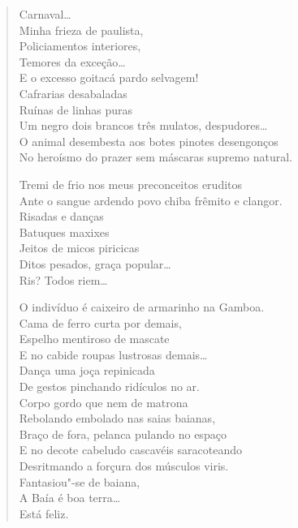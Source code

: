 {\begin{verse}
Carnaval\ldots{}\\
Minha frieza de paulista,\\
Policiamentos interiores,\\
Temores da exceção\ldots{}\\
E o excesso goitacá pardo selvagem!\\
Cafrarias desabaladas\\
Ruínas de linhas puras\\
Um negro dois brancos três mulatos, despudores\ldots{}\\
O animal desembesta aos botes pinotes desengonços\\
No heroísmo do prazer sem máscaras supremo natural.

Tremi de frio nos meus preconceitos eruditos\\
Ante o sangue ardendo povo chiba frêmito e clangor.\\
Risadas e danças\\
Batuques maxixes\\
Jeitos de micos piricicas\\
Ditos pesados, graça popular\ldots{}\\
Ris? Todos riem\ldots{}

O indivíduo é caixeiro de armarinho na Gamboa.\\
Cama de ferro curta por demais,\\
Espelho mentiroso de mascate\\
E no cabide roupas lustrosas demais\ldots{}\\
Dança uma joça repinicada\\
De gestos pinchando ridículos no ar.\\
Corpo gordo que nem de matrona\\
Rebolando embolado nas saias baianas,\\
Braço de fora, pelanca pulando no espaço\\
E no decote cabeludo cascavéis saracoteando\\
Desritmando a forçura dos músculos viris.\\
Fantasiou"-se de baiana,\\
\qquad\qquad\qquad\qquad\quad A Baía é boa terra\ldots{}\\
\qquad\qquad\qquad\qquad\qquad\qquad\qquad\qquad\quad Está feliz.


\end{verse}}
